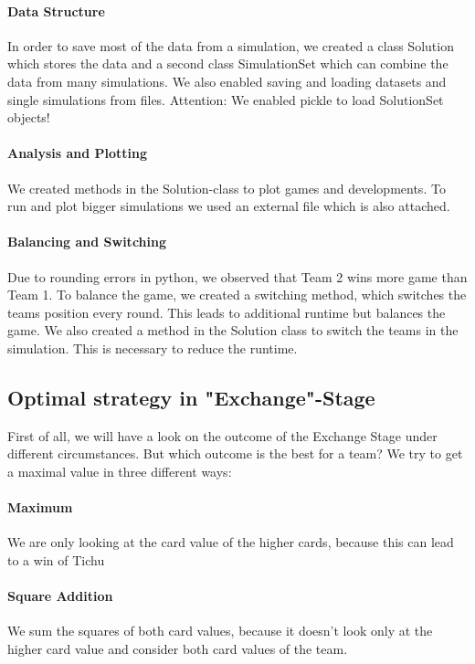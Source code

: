 \paragraph{Data Structure}
In order to save most of the data from a simulation, we created a class Solution which stores the data and a second class SimulationSet which can combine the data from many simulations. We also enabled saving and loading datasets and single simulations from files. Attention: We enabled pickle to load SolutionSet objects!  

\paragraph{Analysis and Plotting}
We created methods in the Solution-class to plot games and developments. To run and plot bigger simulations we used an external file which is also attached. 

\paragraph{Balancing and Switching}
Due to rounding errors in python, we observed that Team 2 wins more game than Team 1. 
To balance the game, we created a switching method, which switches the teams position every round. This leads to additional runtime but balances the game. 
We also created a method in the Solution class to switch the teams in the simulation. This is necessary to reduce the runtime. 

\subsection{Optimal strategy in "Exchange"-Stage}

First of all, we will have a look on the outcome of the Exchange Stage under different circumstances. But which outcome is the best for a team? We try to get a maximal value in three different ways:

\paragraph{Maximum}  We are only looking at the card value of the higher cards, because this can lead to a win of Tichu
\paragraph{Square Addition}  We sum the squares of both card values, because it doesn’t look only at the higher card value and consider both card values of the team.
